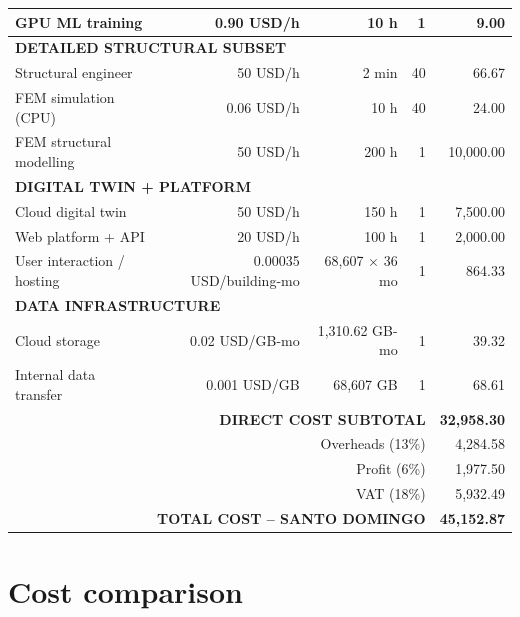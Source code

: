 \begin{longtable}{lrrrr}
GPU ML training & 0.90 USD/h & 10 h & 1 & 9.00 \\
\hline

\multicolumn{5}{l}{\textbf{DETAILED STRUCTURAL SUBSET}} \\

Structural engineer & 50 USD/h & 2 min & 40 & 66.67 \\
FEM simulation (CPU) & 0.06 USD/h & 10 h & 40 & 24.00 \\
FEM structural modelling & 50 USD/h & 200 h & 1 & 10,000.00 \\
\hline

\multicolumn{5}{l}{\textbf{DIGITAL TWIN + PLATFORM}} \\

Cloud digital twin & 50 USD/h & 150 h & 1 & 7,500.00 \\
Web platform + API & 20 USD/h & 100 h & 1 & 2,000.00 \\
User interaction / hosting & 0.00035 USD/building-mo & 68,607 × 36 mo & 1 & 864.33 \\
\hline

\multicolumn{5}{l}{\textbf{DATA INFRASTRUCTURE}} \\

Cloud storage & 0.02 USD/GB-mo & 1,310.62 GB-mo & 1 & 39.32 \\
Internal data transfer & 0.001 USD/GB & 68,607 GB & 1 & 68.61 \\
\hline

\multicolumn{4}{r}{\textbf{DIRECT COST SUBTOTAL}} & \textbf{32,958.30} \\
\hline

\multicolumn{4}{r}{Overheads (13\%)} & 4,284.58 \\
\multicolumn{4}{r}{Profit (6\%)} & 1,977.50 \\
\multicolumn{4}{r}{VAT (18\%)} & 5,932.49 \\
\hline

\multicolumn{4}{r}{\textbf{TOTAL COST – SANTO DOMINGO}} & \textbf{45,152.87} \\
\hline

\end{longtable}

\renewcommand{\sectionnametext}{Cost comparison}
\renewcommand{\headingtextR}{\thesection. \sectionnametext}
\section{\sectionnametext}


